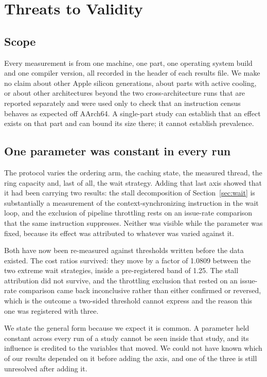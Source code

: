 \documentclass[conference]{IEEEtran}
\begin{document}
\section{Threats to Validity}

\subsection{Scope}

Every measurement is from one machine, one part, one operating system build and
one compiler version, all recorded in the header of each results file. We make
no claim about other Apple silicon generations, about parts with active cooling,
or about other architectures beyond the two cross-architecture runs that are
reported separately and were used only to check that an instruction census
behaves as expected off AArch64. A single-part study can establish that an
effect exists on that part and can bound its size there; it cannot establish
prevalence.

\subsection{One parameter was constant in every run}

The protocol varies the ordering arm, the caching state, the measured thread,
the ring capacity and, last of all, the wait strategy. Adding that last axis
showed that it had been carrying two results: the stall decomposition of
Section~\ref{sec:wait} is substantially a measurement of the
context-synchronizing instruction in the wait loop, and the exclusion of
pipeline throttling rests on an issue-rate comparison that the same instruction
suppresses. Neither was visible while the parameter was fixed, because its
effect was attributed to whatever was varied against it.

Both have now been re-measured against thresholds written before the data
existed. The cost ratios survived: they move by a factor of 1.0809 between the
two extreme wait strategies, inside a pre-registered band of 1.25. The stall
attribution did not survive, and the throttling exclusion that rested on an
issue-rate comparison came back inconclusive rather than either confirmed or
reversed, which is the outcome a two-sided threshold cannot express and the
reason this one was registered with three.

We state the general form because we expect it is common. A parameter held
constant across every run of a study cannot be seen inside that study, and its
influence is credited to the variables that moved. We could not have known which
of our results depended on it before adding the axis, and one of the three is
still unresolved after adding it.
\end{document}
